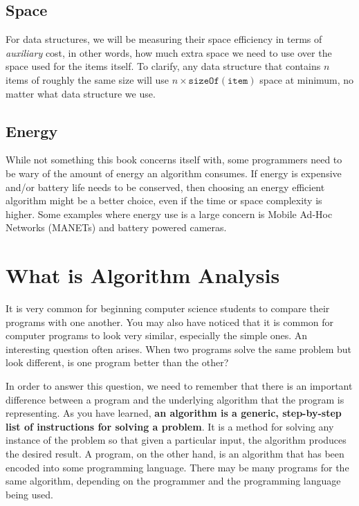 \subsection{Space}

For data structures, we will be measuring their space efficiency in terms of \textit{auxiliary} cost, in other words, how much extra space we need to use over the space used for the items itself.   To clarify, any data structure that contains $ n $ items of roughly the same size will use $ n \times \mathtt{sizeOf(item)}$ space at minimum, no matter what data structure we use.  

\subsection{Energy}
While not something this book concerns itself with, some programmers need to be wary of the amount of energy  an algorithm consumes.  If energy is expensive and/or battery life needs to be conserved, then choosing an energy efficient algorithm might be a better choice, even if the time or space complexity is higher.  Some examples where energy use is a large concern  is Mobile Ad-Hoc Networks (MANETs) and battery powered cameras.




\section{What is Algorithm Analysis}

It is very common for beginning computer science students to compare their programs with one another. 
You may also have noticed that it is common for computer programs to look very similar, especially the simple ones. An interesting question often arises. 
When two programs solve the same problem but look different, is one program better than the other? 

In order to answer this question, we need to remember that there is an important difference between a program and the underlying algorithm that the program is representing. 
As you have learned, \textbf{an algorithm is a generic, step-by-step list of instructions for solving a problem}. 
It is a method for solving any instance of the problem so that given a particular input, the algorithm produces the desired result. A program, on the other hand, is an algorithm that has been encoded into some programming language. 
There may be many programs for the same algorithm, depending on the programmer and the programming language being used. 

